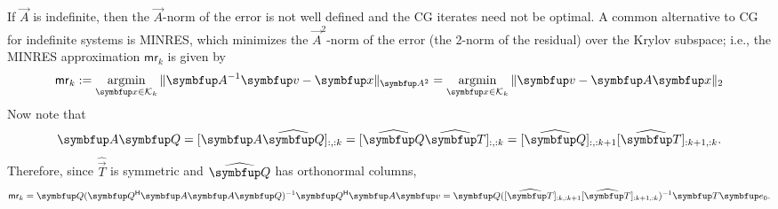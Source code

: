 If $\vec{A}$ is indefinite, then the $\vec{A}$-norm of the error is not well defined and the CG iterates need not be optimal.
A common alternative to CG for indefinite systems is MINRES, which minimizes the $\vec{A}^2$-norm of the error (the 2-norm of the residual) over the Krylov subspace; i.e., the MINRES approximation $\mathsf{mr}_k$ is given by
\begin{equation*}
    \mathsf{mr}_k
    := \argmin_{\vec{x}\in\mathcal{K}_k}
    \| \vec{A}^{-1} \vec{v} - \vec{x} \|_{\vec{A}^2}
    =
    \argmin_{\vec{x}\in\mathcal{K}_k}
    \| \vec{v} - \vec{A}\vec{x} \|_{2}
\end{equation*}
Now note that
\begin{equation*}
    \vec{A} \vec{Q} 
    = [\vec{A} \Qhat]_{:,:k}
    =[\Qhat\widehat{\vec{T}}]_{:,:k}
    =[\Qhat]_{:,:k+1} [\widehat{\vec{T}}]_{:k+1,:k}.
\end{equation*}
Therefore, since $\widehat{\vec{T}}$ is symmetric and $\Qhat$ has orthonormal columns,
\label{eqn:mr_def}
\begin{equation*}
    \mathsf{mr}_k = \vec{Q} (\vec{Q}^\cT \vec{A} \vec{A} \vec{Q})^{-1} \vec{Q}^\cT \vec{A} \vec{v}
    = \vec{Q} ([\widehat{\vec{T}}]_{:k,:k+1}[\widehat{\vec{T}}]_{:k+1,:k})^{-1} \vec{T} \vec{e}_0.
\end{equation*}

